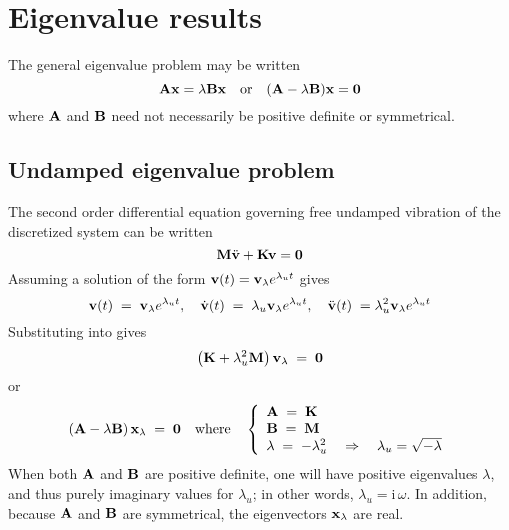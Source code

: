 %
%

%
%

\section{Eigenvalue results}

The general eigenvalue problem may be written
%
\begin{equation}
{\bf A}{\bf x} = \lambda{\bf B}{\bf x} \quad\text{or}\quad
({\bf A} -\lambda{\bf B}){\bf x} = {\bf 0}
\label{eqEIG:Def}
\end{equation}
%
where $\bf A$ and $\bf B$ need not necessarily be positive definite
or symmetrical.

\subsection{Undamped eigenvalue problem}

The second order differential equation governing free undamped vibration of the
discretized system can be written
%
\begin{equation}
{\bf M}\ddot{\bf v} + {\bf K}{\bf v} = {\bf 0}
\label{eqEIG:DiffUndamped}
\end{equation}
%
Assuming a solution of the form ${\bf v}(t) = {\bf v}_\lambda e^{\lambda_u t}$
gives
%
\begin{equation}
{\bf v}(t) \;=\; {\bf v}_{\lambda} e^{\lambda_u t}, \quad
\dot{\bf v}(t) \;=\; \lambda_u{\bf v}_{\lambda} e^{\lambda_u t}, \quad
\ddot{\bf v}(t) \;= \lambda_u^2{\bf v}_{\lambda} e^{\lambda_u t}
\label{eqEIG:AssumedSol}
\end{equation}
%
Substituting into  gives
%
\begin{equation}
\left({\bf K} + \lambda_u^2 {\bf M}\right) {\bf v}_{\lambda} \;=\; {\bf 0}
\label{eqEIG:Undamp1}
\end{equation}
%
or
%
\begin{equation}
\left({\bf A} - \lambda{\bf B}\right){\bf x}_{\lambda} \;=\; {\bf 0}
\quad\text{where}\quad
\left\{\begin{array}{l}
{\bf A} \;=\; {\bf K} \\
{\bf B} \;=\; {\bf M} \\
\lambda \;=\; -\lambda_u^2 \quad\Rightarrow\quad \lambda_u = \sqrt{-\lambda}
\end{array}\right.
\label{eqEIG:Undamp2}
\end{equation}
%
When both $\bf A$ and $\bf B$ are positive definite, one will have positive
eigenvalues $\lambda$, and thus purely imaginary values for $\lambda_u$;
in other words, $\lambda_u = \text{i}\,\omega$.
In addition, because $\bf A$ and $\bf B$ are symmetrical, the eigenvectors
${\bf x}_{\lambda}$ are real.

